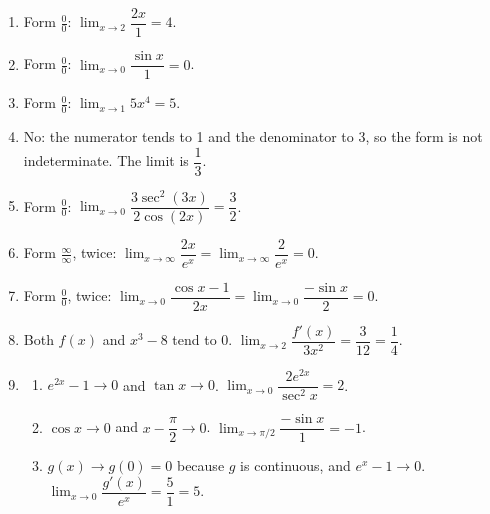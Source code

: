 \documentclass[11pt]{article}
\begin{document}
\newpage
\begin{solbox}
\begin{enumerate}[leftmargin=*,itemsep=4pt]
  \item Form $\tfrac00$: $\displaystyle\lim_{x\to 2}\dfrac{2x}{1}=4$.
  \item Form $\tfrac00$: $\displaystyle\lim_{x\to 0}\dfrac{\sin x}{1}=0$.
  \item Form $\tfrac00$: $\displaystyle\lim_{x\to 1}5x^4=5$.
  \item No: the numerator tends to 1 and the denominator to 3, so the form is not indeterminate. The limit is $\dfrac13$.
  \item Form $\tfrac00$: $\displaystyle\lim_{x\to 0}\dfrac{3\sec^2(3x)}{2\cos(2x)}=\dfrac32$.
  \item Form $\tfrac\infty\infty$, twice: $\displaystyle\lim_{x\to \infty}\dfrac{2x}{e^{x}}=\displaystyle\lim_{x\to \infty}\dfrac{2}{e^{x}}=0$.
  \item Form $\tfrac00$, twice: $\displaystyle\lim_{x\to 0}\dfrac{\cos x-1}{2x}=\displaystyle\lim_{x\to 0}\dfrac{-\sin x}{2}=0$.
  \item Both $f(x)$ and $x^3-8$ tend to 0. $\displaystyle\lim_{x\to 2}\dfrac{f'(x)}{3x^2}=\dfrac{3}{12}=\dfrac14$.
  \item \begin{enumerate}[label=(\alph*),leftmargin=*,itemsep=3pt]
    \item $e^{2x}-1\to0$ and $\tan x\to0$. $\displaystyle\lim_{x\to 0}\dfrac{2e^{2x}}{\sec^2x}=2$.
    \item $\cos x\to0$ and $x-\dfrac\pi2\to0$. $\displaystyle\lim_{x\to \pi/2}\dfrac{-\sin x}{1}=-1$.
    \item $g(x)\to g(0)=0$ because $g$ is continuous, and $e^{x}-1\to0$. $\displaystyle\lim_{x\to 0}\dfrac{g'(x)}{e^{x}}=\dfrac{5}{1}=5$.
  \end{enumerate}
\end{enumerate}
\end{solbox}
\end{document}
